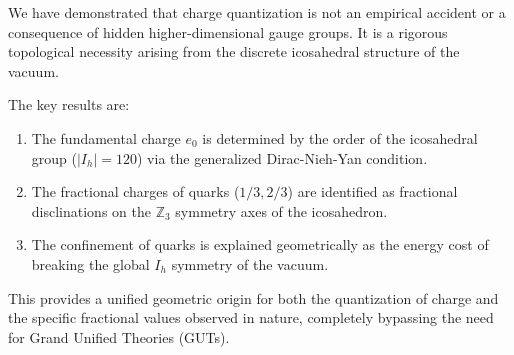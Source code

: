 We have demonstrated that charge quantization is not an empirical accident or a consequence of hidden higher-dimensional gauge groups. It is a rigorous topological necessity arising from the discrete icosahedral structure of the vacuum. 

The key results are:
\begin{enumerate}
    \item The fundamental charge $e_0$ is determined by the order of the icosahedral group ($|I_h| = 120$) via the generalized Dirac-Nieh-Yan condition.
    \item The fractional charges of quarks ($1/3, 2/3$) are identified as fractional disclinations on the $\mathbb{Z}_3$ symmetry axes of the icosahedron.
    \item The confinement of quarks is explained geometrically as the energy cost of breaking the global $I_h$ symmetry of the vacuum.
\end{enumerate}

This provides a unified geometric origin for both the quantization of charge and the specific fractional values observed in nature, completely bypassing the need for Grand Unified Theories (GUTs).